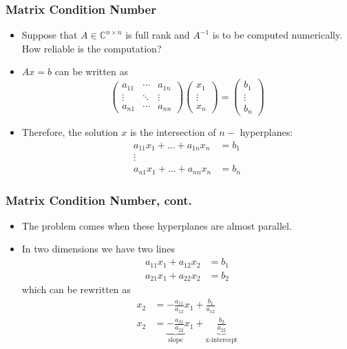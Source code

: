 \documentclass{beamer}
\begin{document}
\begin{frame}\frametitle{Matrix Condition Number}
	\begin{itemize}
	\item 	Suppose that $A \in \mathbb{C}^{n \times n}$ is full rank and $A^{-1}$ is to be computed numerically.  How reliable is the computation?
	\item $Ax = b$ can be written as 
		\[
			\begin{pmatrix}
   	 			a_{11} & \cdots & a_{1n}\\
    			\vdots & \ddots & \vdots\\
    			a_{n1} & \cdots & a_{nn}
    		\end{pmatrix}
    		\begin{pmatrix}
    			x_1 \\ \vdots \\ x_n
    		\end{pmatrix}
			=
			\begin{pmatrix}
				b_1 \\ \vdots \\ b_n	
			\end{pmatrix}
		\]
	\item Therefore, the solution $x$ is the intersection of $n-$ hyperplanes:
		\begin{align*}
		a_{11}x_1 + \ldots + a_{1n}x_n &= b_1\\
		\vdots\\
		a_{n1}x_1 + \ldots + a_{nn}x_n &= b_n
		\end{align*}
	\end{itemize}
\end{frame}

\begin{frame}\frametitle{Matrix Condition Number, cont.}
	\begin{itemize}
		\item The problem comes when these hyperplanes are almost parallel.
		\item In two dimensions we have two lines
			\begin{align*}
				a_{11}x_1 + a_{12}x_2 &= b_1\\
				a_{21}x_1 + a_{22}x_2 &= b_2
			\end{align*}
			which can be rewritten as
			\begin{align*}
  				x_2 &= -\frac{a_{11}}{a_{12}}x_1 + \frac{b_1}{a_{12}}\\
  				x_2 &= \underbrace{-\frac{a_{21}}{a_{22}}}_{\text{slope}}x_1 + \underbrace{\frac{b_2}{a_{22}}}_{\text{x-intercept}} 
			\end{align*}
	\end{itemize}
\end{frame}
\end{document}
